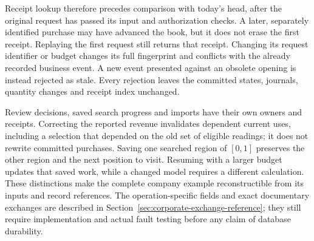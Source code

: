 Receipt lookup therefore precedes comparison with today's head, after the
original request has passed its input and authorization checks. A later,
separately identified purchase may have advanced the book, but it does not
erase the first receipt. Replaying the first request still returns that receipt.
Changing its request identifier or budget changes its full fingerprint and
conflicts with the already recorded business event. A new event presented
against an obsolete opening is instead rejected as stale. Every rejection
leaves the committed states, journals, quantity changes and receipt index
unchanged.

Review decisions, saved search progress and imports have their own owners and
receipts. Correcting the reported revenue invalidates dependent current uses,
including a selection that depended on the old set of eligible readings; it
does not rewrite committed purchases. Saving one searched region of
$[0,1]$ preserves the other region and the next position to visit. Resuming
with a larger budget updates that saved work, while a changed model requires
a different calculation. These distinctions make the complete company example
reconstructible from its inputs and record references. The operation-specific
fields and exact documentary exchanges are described in
Section~\ref{sec:corporate-exchange-reference}; they still require implementation
and actual fault testing before any claim of database durability.
